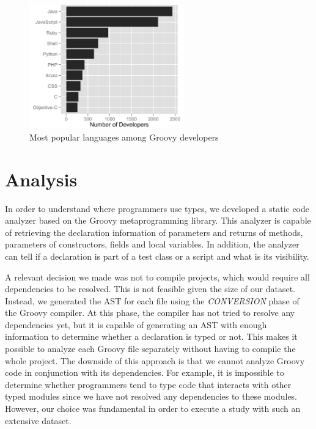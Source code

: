 \documentclass[msc]{ppgccufmg}
\begin{document}
\begin{figure}[h!]
\centering \includegraphics[width=0.6\textwidth]{../aosd_2014/analysis/result/languages.png}
\caption{Most popular languages among Groovy developers}
\label{fig:other_languages} 
\end{figure}



\section{Analysis\label{analyzer}}
In order to understand where programmers use types, we developed a static code analyzer based on the Groovy metaprogramming library.
This analyzer is capable of retrieving the declaration information of parameters and returns of methods, parameters of constructors, fields and local variables.
In addition, the analyzer can tell if a declaration is part of a test class or a script and what is its visibility.

A relevant decision we made was not to compile projects, which would require all dependencies to be resolved.
This is not feasible given the size of our dataset.
Instead, we generated the AST for each file using the \emph{CONVERSION} phase of the Groovy compiler.
At this phase, the compiler has not tried to resolve any dependencies yet, but it is capable of generating an AST with enough information to determine whether a declaration is typed or not.
This makes it possible to analyze each Groovy file separately without having to compile the whole project.
The downside of this approach is that we cannot analyze Groovy code in conjunction with its dependencies. 
For example, it is impossible to determine whether programmers tend to type code that interacts with other typed modules since we have not resolved any dependencies to these modules.
However, our choice was fundamental in order to execute a study with such an extensive dataset.
\end{document}
